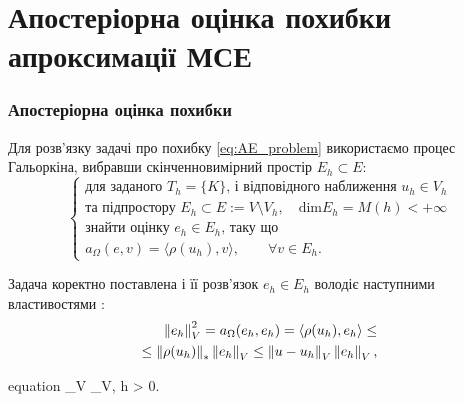 
\section{Апостеріорна оцінка похибки апроксимації МСЕ}
\frame{\sectionpage}
\begin{frame}[allowframebreaks]
	\frametitle<presentation>{Апостеріорна оцінка похибки}
	Для розв'язку задачі про похибку
		\eqref{eq:AE_problem} використаємо процес Гальоркіна, вибравши скінченновимірний простір $E_h \subset E$:
		\begin{equation}\label{eq:AEE_formulation}
			\begin{cases}
				\mbox{для заданого } T_h=\{K\} \text{, і відповідного наближення } u_h \in V_h \\
				\text{та підпростору } E_h \subset E:=V \setminus V_h, \quad \text{dim} E_h = M(h) < +\infty \\
				\text{знайти оцінку } e_h \in E_h \text{, таку що} \\
				a_\Omega(e,v) = \langle\rho(u_h), v\rangle, \qquad \forall v \in E_h.
			\end{cases}
		\end{equation}

		\framebreak

			Задача коректно поставлена і її розв'язок $e_h \in E_h$ володіє наступними властивостями :
			\begin{equation}
				\begin{split}
					\left\lVert e_h\right\rVert_V^2 = a_\Omega(e_h, e_h) = \langle\rho(u_h), e_h\rangle \le \\
					\le \left\lVert\rho(u_h)\right\rVert_* \left\lVert e_h\right\rVert_V \le \left\lVert u-u_h\right\rVert_V \left\lVert e_h\right\rVert_V,
				\end{split}
			\end{equation}

			\begin{empheq}[innerbox=\fbox]{equation}
				_V \le {}_V, \quad \forall h > 0.
			\end{empheq}

\end{frame}
